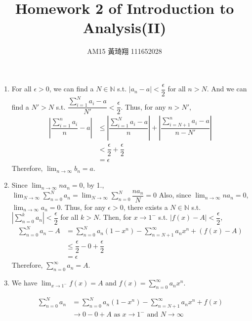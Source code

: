 \documentclass[12pt]{article}
\title{Homework 2 of Introduction to Analysis(II)}
\author{AM15 黃琦翔 111652028}
\begin{document}
\maketitle
\begin{enumerate}
    \item For all $\epsilon > 0$, we can find a $N \in \mathbb{N}$ s.t. $|a_n - a| < \dfrac{\epsilon}{2}$ for all $n > N$.
    And we can find a $N' > N$ s.t. $\dfrac{\displaystyle\sum_{i=1}^{N} a_i - a}{N'} < \dfrac{\epsilon}{2}$.
    Thus, for any $n > N'$, \begin{align*}
        |\dfrac{\sum_{i=1}^{n} a_i }{n} - a| &\leq |\dfrac{\sum_{i=1}^{N} a_i - a}{n}| + |\dfrac{\sum_{i=N+1}^{n} a_i - a}{n - N'}|\\
        &< \dfrac{\epsilon}{2} + \dfrac{\epsilon}{2}\\
        &= \epsilon
    \end{align*}
    Therefore, $\displaystyle\lim_{n\to\infty} b_n = a$.

    \item Since $\displaystyle\lim_{n\to\infty} na_n = 0$, by 1., $\displaystyle\lim_{N\to\infty} \displaystyle\sum_{n=0}^{N} a_n = \displaystyle\lim_{N\to\infty} \displaystyle\sum_{n=0}^{N} \dfrac{na_n}{N} = 0$
    Also, since $\displaystyle\lim_{n\to\infty} na_n = 0$, $\displaystyle\lim_{n\to\infty} a_n = 0$.
    Thus, for any $\epsilon > 0$,  there exists a $N \in \mathbb{N}$ s.t. $|\displaystyle\sum_{n=0}^{k} a_n| < \dfrac{\epsilon}{2}$ for all $k > N$.
    Then, for $x \to 1^{-}$ s.t. $|f(x) - A| < \dfrac{\epsilon}{2}$, \begin{align*}
        \sum_{n=0}^{N} a_n - A &= \sum_{n=0}^{N} a_n(1-x^n) - \sum_{n=N+1}^{\infty} a_n x^n + (f(x) - A)\\
        &\leq \dfrac{\epsilon}{2} - 0 + \dfrac{\epsilon}{2}\\
        &= \epsilon
    \end{align*}
    Therefore, $\displaystyle\sum_{n=0}^{\infty} a_n = A$.

    \newpage
    \item We have $\displaystyle\lim_{x\to 1^{-}} f(x) = A$ and $f(x) = \displaystyle\sum_{n=0}^{\infty} a_n x^n$.
    
    \begin{align*}
        \sum_{n=0}^{N} a_n &= \sum_{n=0}^{N} a_n(1 - x^n) - \sum_{n=N+1}^{\infty} a_nx^{n} + f(x)\\
        &\to 0 - 0 + A\text{ as } x \to 1^-\text{ and } N \to \infty
    \end{align*}
\end{enumerate}
\end{document}
